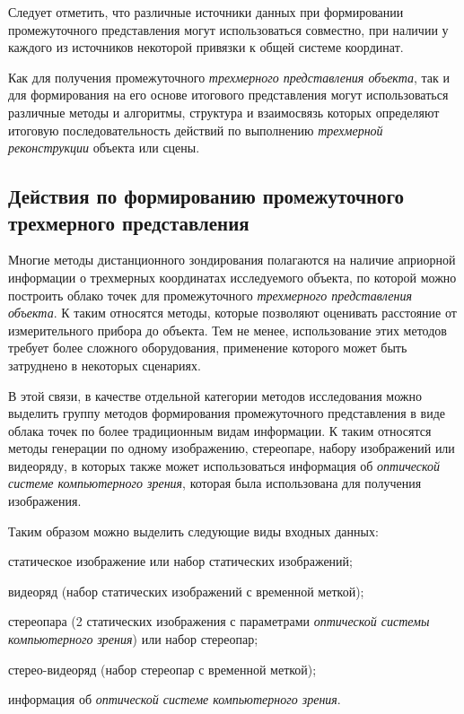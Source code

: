 Следует отметить, что различные источники данных при формировании промежуточного представления могут использоваться совместно, при наличии у каждого из источников некоторой привязки к общей системе координат.

Как для получения промежуточного \textit{трехмерного представления объекта}, так и для формирования на его основе итогового представления могут использоваться различные методы и алгоритмы, структура и взаимосвязь которых определяют итоговую последовательность действий по выполнению \textit{трехмерной реконструкции} объекта или сцены.


\subsection{Действия по формированию промежуточного трехмерного представления}
\label{sec_3d_models_actions_interm}

Многие методы дистанционного зондирования полагаются на наличие априорной информации о трехмерных координатах исследуемого объекта, по которой можно построить облако точек для промежуточного \textit{трехмерного представления объекта}. К таким относятся методы, которые позволяют оценивать расстояние от измерительного прибора до объекта. Тем не менее, использование этих методов требует более сложного оборудования, применение которого может быть затруднено в некоторых сценариях.

В этой связи, в качестве отдельной категории методов исследования можно выделить группу методов формирования промежуточного представления в виде облака точек по более традиционным видам информации. К таким относятся методы генерации по одному изображению, стереопаре, набору изображений или видеоряду, в которых также может использоваться информация об \textit{оптической системе компьютерного зрения}, которая была использована для получения изображения.

Таким образом можно выделить следующие виды входных данных:
\begin{textitemize}
    \item статическое изображение или набор статических изображений;
    \item видеоряд (набор статических изображений с временной меткой);
    \item стереопара (2 статических изображения с параметрами \textit{оптической системы компьютерного зрения}) или набор стереопар;
    \item стерео-видеоряд (набор стереопар с временной меткой);
    \item информация об \textit{оптической системе компьютерного зрения}.
\end{textitemize}

